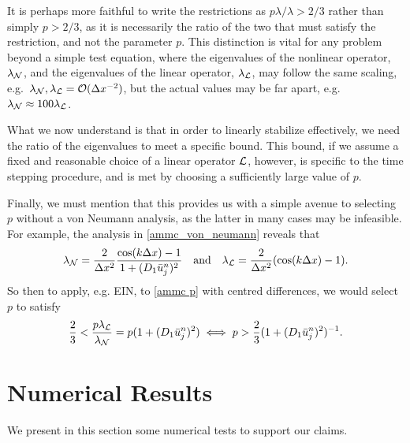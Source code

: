 \begin{remark}
	It is perhaps more faithful to write the restrictions as $p\lambda / \lambda > 2/3$ rather than simply $p > 2/3$, as it is necessarily the ratio of the two that must satisfy the restriction, and not the parameter $p$. This distinction is vital for any problem beyond a simple test equation, where the eigenvalues of the nonlinear operator, $\lambda_{\mathcal{N}}$, and the eigenvalues of the linear operator, $\lambda_{\mathcal{L}}$, may follow the same scaling, e.g.\ $\lambda_{\mathcal{N}}, \lambda_{\mathcal{L}} = \mathcal{O}(\Delta x^{-2})$, but the actual values may be far apart, e.g.\ $\lambda_{\mathcal{N}} \approx 100 \lambda_{\mathcal{L}}$.
\end{remark}
\begin{remark}
	What we now understand is that in order to linearly stabilize effectively, we need the ratio of the eigenvalues to meet a specific bound. This bound, if we assume a fixed and reasonable choice of a linear operator $\mathcal{L}$, however, is specific to the time stepping procedure, and is met by choosing a sufficiently large value of $p$.  
\end{remark}
\begin{remark}
	Finally, we must mention that this provides us with a simple avenue to selecting $p$ without a von Neumann analysis, as the latter in many cases may be infeasible. For example, the analysis in \eqref{ammc_von_neumann} reveals that 
\begin{align}
        \lambda_{\mathcal{N}} = \frac{2}{\Delta x^2}\frac{\cos(k\Delta x)-1}{1 + (D_1\bar u_j^n)^2}
\quad\text{and}\quad 
\lambda_{\mathcal{L}} = \frac{2}{\Delta x^2}(\cos(k\Delta x) - 1).
\end{align}
So then to apply, e.g. EIN, to \eqref{ammc p} with centred differences, we would select $p$ to satisfy 
\begin{align}
        \frac{2}{3} < \frac{p\lambda_{\mathcal{L}}}{\lambda_{\mathcal{N}}} = p(1 + (D_1 \bar u_j^n)^2) 
\iff 
p > \frac{2}{3}(1 + (D_1 \bar u^n_j)^2)^{-1}.
\end{align}
 

\end{remark}

\section{Numerical Results}
We present in this section some numerical tests to support our claims.

